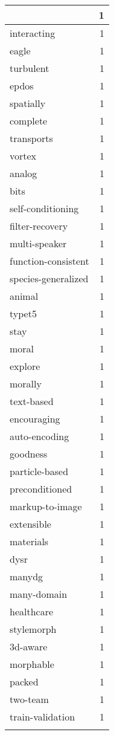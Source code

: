 \begin{table}[h]
\begin{tabular}{|l|r|}
{\hline
scenario-based & 1 \\
\hline
interacting & 1 \\
\hline
eagle & 1 \\
\hline
turbulent & 1 \\
\hline
epdos & 1 \\
\hline
spatially & 1 \\
\hline
complete & 1 \\
\hline
transports & 1 \\
\hline
vortex & 1 \\
\hline
analog & 1 \\
\hline
bits & 1 \\
\hline
self-conditioning & 1 \\
\hline
filter-recovery & 1 \\
\hline
multi-speaker & 1 \\
\hline
function-consistent & 1 \\
\hline
species-generalized & 1 \\
\hline
animal & 1 \\
\hline
typet5 & 1 \\
\hline
stay & 1 \\
\hline
moral & 1 \\
\hline
explore & 1 \\
\hline
morally & 1 \\
\hline
text-based & 1 \\
\hline
encouraging & 1 \\
\hline
auto-encoding & 1 \\
\hline
goodness & 1 \\
\hline
particle-based & 1 \\
\hline
preconditioned & 1 \\
\hline
markup-to-image & 1 \\
\hline
extensible & 1 \\
\hline
materials & 1 \\
\hline
dysr & 1 \\
\hline
manydg & 1 \\
\hline
many-domain & 1 \\
\hline
healthcare & 1 \\
\hline
stylemorph & 1 \\
\hline
3d-aware & 1 \\
\hline
morphable & 1 \\
\hline
packed & 1 \\
\hline
two-team & 1 \\
\hline
train-validation & 1 \\
}
\end{tabular}
\end{table}
